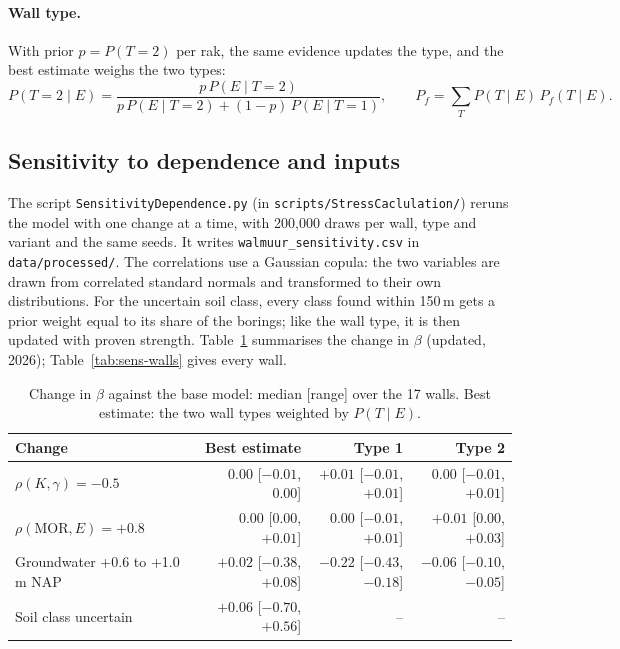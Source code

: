 \paragraph{Wall type.} With prior $p = P(T = 2)$ per rak, the same evidence
updates the type, and the best estimate weighs the two types:
\begin{equation}
P(T = 2 \mid E) = \frac{p\,P(E \mid T=2)}{p\,P(E \mid T=2) + (1-p)\,P(E \mid T=1)},
\qquad
P_f = \sum_{T} P(T \mid E)\,P_f(T \mid E).
\end{equation}

\subsection{Sensitivity to dependence and inputs}\label{app:prob-sensitivity}

The script \texttt{SensitivityDependence.py} (in
\texttt{scripts/StressCaclulation/}) reruns the model with one change at a
time, with 200{,}000 draws per wall, type and variant and the same seeds. It
writes \texttt{walmuur\_sensitivity.csv} in \texttt{data/processed/}. The
correlations use a Gaussian copula: the two variables are drawn from
correlated standard normals and transformed to their own distributions. For
the uncertain soil class, every class found within 150\,m gets a prior weight
equal to its share of the borings; like the wall type, it is then updated
with proven strength. Table~\ref{tab:sens-summary} summarises the change in
$\beta$ (updated, 2026); Table~\ref{tab:sens-walls} gives every wall.

\begin{table}[htbp]
\centering
\small
\caption{Change in $\beta$ against the base model: median [range] over the
17 walls. Best estimate: the two wall types weighted by $P(T \mid E)$.}
\label{tab:sens-summary}
\setlength{\tabcolsep}{4pt}
\begin{tabular}{@{}l r r r@{}}
\toprule
Change & Best estimate & Type 1 & Type 2 \\
\midrule
$\rho(K,\gamma) = -0.5$ & $0.00$ [$-0.01$, $0.00$] & $+0.01$ [$-0.01$, $+0.01$] & $0.00$ [$-0.01$, $+0.01$] \\
$\rho(\text{MOR},E) = +0.8$ & $0.00$ [$0.00$, $+0.01$] & $0.00$ [$-0.01$, $+0.01$] & $+0.01$ [$0.00$, $+0.03$] \\
Groundwater +0.6 to +1.0\,m NAP & $+0.02$ [$-0.38$, $+0.08$] & $-0.22$ [$-0.43$, $-0.18$] & $-0.06$ [$-0.10$, $-0.05$] \\
Soil class uncertain & $+0.06$ [$-0.70$, $+0.56$] & -- & -- \\
\bottomrule
\end{tabular}
\end{table}

